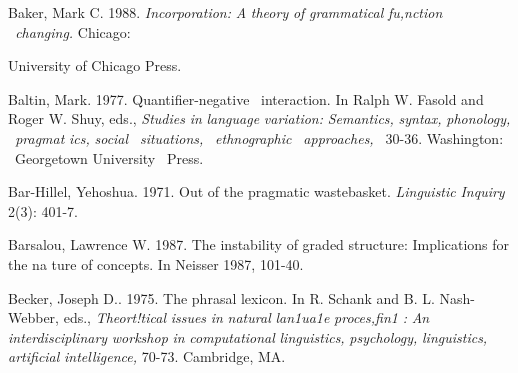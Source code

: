 \begin{styleStandard}
Baker, Mark C. 1988. \textit{Incorporation:}\textit{ }\textit{A}\textit{ }\textit{theory}\textit{ }\textit{of}\textit{ }\textit{grammatical}\textit{ }\textit{fu,nction }\textit{\ }\textit{changing.}\textit{ }Chicago:
\end{styleStandard}


\begin{styleStandard}
University of Chicago Press.
\end{styleStandard}


\begin{styleStandard}
Baltin, Mark. 1977. Quantifier-negative \ interaction. In Ralph W. Fasold and Roger W. Shuy, eds., \textit{Studies}\textit{ }\textit{in}\textit{ }\textit{language}\textit{ }\textit{variation:}\textit{ }\textit{Semantics,}\textit{ }\textit{syntax,}\textit{ }\textit{phonology, }\textit{\ }\textit{pragmat\-}\textit{ }\textit{ics,}\textit{ }\textit{social }\textit{\ }\textit{situations, }\textit{\ }\textit{ethnographic }\textit{\ }\textit{approaches, }\textit{\ }30-36. Washington: \ Georgetown University \ Press.
\end{styleStandard}


\begin{styleStandard}
Bar-Hillel, Yehoshua. 1971. Out of the pragmatic wastebasket. \textit{Linguistic}\textit{ }\textit{Inquiry}\textit{ }2(3): 401-7.\ \ {\textquotesingle}
\end{styleStandard}


\begin{styleStandard}
Barsalou, Lawrence W. 1987. The instability of graded structure: Implications for the na\- ture of concepts. In Neisser 1987, 101-40.
\end{styleStandard}


\begin{styleStandard}
Becker, Joseph D.. 1975. The phrasal lexicon. In R. Schank and B. L. Nash-Webber, eds., \textit{Theort!tical}\textit{ }\textit{issues}\textit{ }\textit{in}\textit{ }\textit{natural}\textit{ }\textit{lan1ua1e}\textit{ }\textit{proces,fin1}\textit{ }\textit{:}\textit{ }\textit{An}\textit{ }\textit{interdisciplinary}\textit{ }\textit{workshop}\textit{ }\textit{in}\textit{ }\textit{computational}\textit{ }\textit{linguistics,}\textit{ }\textit{psychology,}\textit{ }\textit{linguistics,}\textit{ }\textit{artificial}\textit{ }\textit{intelligence,}\textit{ }70-73. Cambridge, MA.
\end{styleStandard}


